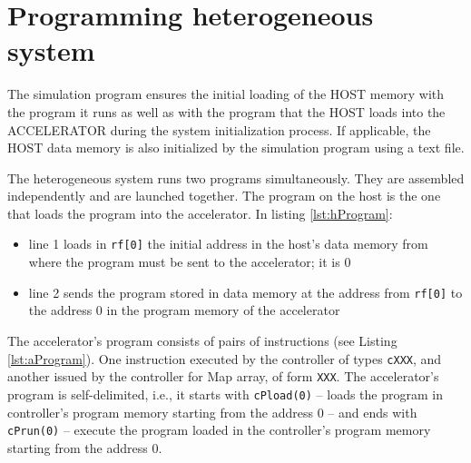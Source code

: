 \section{Programming heterogeneous system}

The simulation program ensures the initial loading of the HOST memory with the program it runs as well as with the program that the HOST loads into the ACCELERATOR during the system initialization process. If applicable, the HOST data memory is also initialized by the simulation program using a text file.

The heterogeneous system runs two programs simultaneously. They are assembled independently and are launched together. The program on the host is the one that loads the program into the accelerator. In listing \ref{lst:hProgram}:
\begin{itemize}
    \item line 1 loads in {\tt rf[0]} the initial address in the host's data memory from where the program must be sent to the accelerator; it is 0
    \item line 2 sends the program stored in data memory at the address from {\tt rf[0]} to the address 0 in the program memory of the accelerator
\end{itemize}

The accelerator's program consists of pairs of instructions (see Listing \ref{lst:aProgram}). One instruction executed by the controller of types {\tt cXXX}, and another issued by the controller for Map array, of form {\tt XXX}.
The accelerator's program is self-delimited, i.e., it starts with {\tt cPload(0)} -- loads the program in controller's program memory starting from the address 0 -- and ends with {\tt cPrun(0)} -- execute the program loaded in the controller's program memory starting from the address 0.


